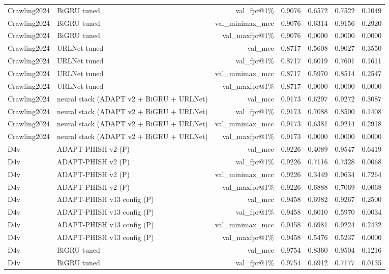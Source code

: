\begin{table}[t]
\begin{tabular}{llrrrrr}
Crawling2024 & BiGRU tuned & val\_fpr@1\% & 0.9076 & 0.6572 & 0.7522 & 0.1049 \\
Crawling2024 & BiGRU tuned & val\_minimax\_mcc & 0.9076 & 0.6314 & 0.9156 & 0.2920 \\
Crawling2024 & BiGRU tuned & val\_maxfpr@1\% & 0.9076 & 0.0000 & 0.0000 & 0.0000 \\
Crawling2024 & URLNet tuned & val\_mcc & 0.8717 & 0.5608 & 0.9027 & 0.3550 \\
Crawling2024 & URLNet tuned & val\_fpr@1\% & 0.8717 & 0.6019 & 0.7601 & 0.1611 \\
Crawling2024 & URLNet tuned & val\_minimax\_mcc & 0.8717 & 0.5970 & 0.8514 & 0.2547 \\
Crawling2024 & URLNet tuned & val\_maxfpr@1\% & 0.8717 & 0.0000 & 0.0000 & 0.0000 \\
Crawling2024 & neural stack (ADAPT v2 + BiGRU + URLNet) & val\_mcc & 0.9173 & 0.6297 & 0.9272 & 0.3087 \\
Crawling2024 & neural stack (ADAPT v2 + BiGRU + URLNet) & val\_fpr@1\% & 0.9173 & 0.7088 & 0.8500 & 0.1408 \\
Crawling2024 & neural stack (ADAPT v2 + BiGRU + URLNet) & val\_minimax\_mcc & 0.9173 & 0.6381 & 0.9214 & 0.2918 \\
Crawling2024 & neural stack (ADAPT v2 + BiGRU + URLNet) & val\_maxfpr@1\% & 0.9173 & 0.0000 & 0.0000 & 0.0000 \\
D4v & ADAPT-PHISH v2 (P) & val\_mcc & 0.9226 & 0.4089 & 0.9547 & 0.6419 \\
D4v & ADAPT-PHISH v2 (P) & val\_fpr@1\% & 0.9226 & 0.7116 & 0.7328 & 0.0068 \\
D4v & ADAPT-PHISH v2 (P) & val\_minimax\_mcc & 0.9226 & 0.3449 & 0.9634 & 0.7264 \\
D4v & ADAPT-PHISH v2 (P) & val\_maxfpr@1\% & 0.9226 & 0.6888 & 0.7069 & 0.0068 \\
D4v & ADAPT-PHISH v13 config (P) & val\_mcc & 0.9458 & 0.6982 & 0.9267 & 0.2500 \\
D4v & ADAPT-PHISH v13 config (P) & val\_fpr@1\% & 0.9458 & 0.6010 & 0.5970 & 0.0034 \\
D4v & ADAPT-PHISH v13 config (P) & val\_minimax\_mcc & 0.9458 & 0.6981 & 0.9224 & 0.2432 \\
D4v & ADAPT-PHISH v13 config (P) & val\_maxfpr@1\% & 0.9458 & 0.5476 & 0.5237 & 0.0000 \\
D4v & BiGRU tuned & val\_mcc & 0.9754 & 0.8360 & 0.9504 & 0.1216 \\
D4v & BiGRU tuned & val\_fpr@1\% & 0.9754 & 0.6912 & 0.7177 & 0.0135 \\

\end{tabular}
\end{table}

